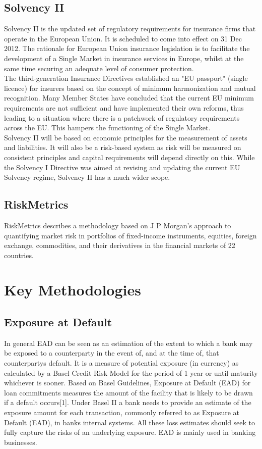 \documentclass[12pt, a4paper]{report}
\begin{document}
\section{Solvency II}
Solvency II is the updated set of regulatory requirements for
insurance firms that operate in the European Union. It is
scheduled to come into effect on 31 Dec 2012. The rationale for
European Union insurance legislation is to facilitate the
development of a Single Market in insurance services in Europe,
whilst at the same time securing an adequate level of consumer
protection. \\The third-generation Insurance Directives
established an "EU passport" (single licence) for insurers based
on the concept of minimum harmonization and mutual recognition.
Many Member States have concluded that the current EU minimum
requirements are not sufficient and have implemented their own
reforms, thus leading to a situation where there is a patchwork of
regulatory requirements across the EU. This hampers the
functioning of the Single Market.\\ Solvency II will be based on
economic principles for the measurement of assets and liabilities.
It will also be a risk-based system as risk will be measured on
consistent principles and capital requirements will depend
directly on this. While the Solvency I Directive was aimed at
revising and updating the current EU Solvency regime, Solvency II
has a much wider scope.

\section{RiskMetrics}
RiskMetrics describes a methodology based on J P Morgan's approach
to quantifying market risk in portfolios of fixed-income
instruments, equities, foreign exchange, commodities, and their
derivatives in the financial markets of 22 countries.
\newpage
\chapter{Key Methodologies}

\section{Exposure at Default}
In general EAD can be seen as an estimation of the extent to which
a bank may be exposed to a counterparty in the event of, and at
the time of, that counterpartys default. It is a measure of
potential exposure (in currency) as calculated by a Basel Credit
Risk Model for the period of 1 year or until maturity whichever is
sooner. Based on Basel Guidelines, Exposure at Default (EAD) for
loan commitments measures the amount of the facility that is
likely to be drawn if a default occurs[1]. Under Basel II a bank
needs to provide an estimate of the exposure amount for each
transaction, commonly referred to as Exposure at Default (EAD), in
banks internal systems. All these loss estimates should seek to
fully capture the risks of an underlying exposure. EAD is mainly
used in banking businesses.
\end{document}
